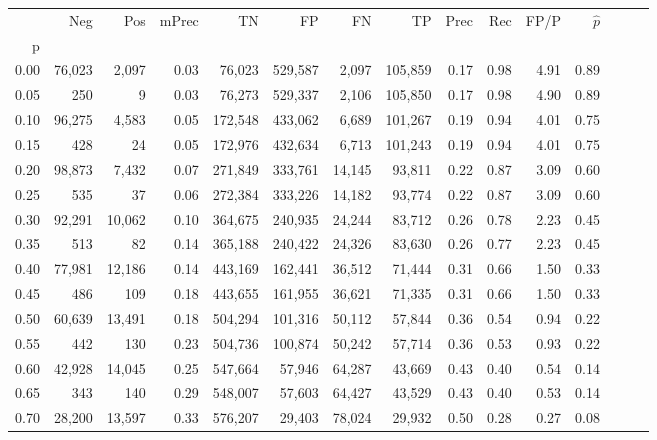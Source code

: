 \begin{tabular}{rrrrrrrrrrrrrrr}
\toprule
{} &     Neg &     Pos & mPrec &       TN &       FP &       FN &       TP &  Prec &   Rec &  FP/P & $\hat{p}$ \\
p    &         &         &       &          &          &          &          &       &       &       &           \\
\midrule
0.00 &  76,023 &   2,097 &  0.03 &   76,023 &  529,587 &    2,097 &  105,859 &  0.17 &  0.98 &  4.91 &      0.89 \\
0.05 &     250 &       9 &  0.03 &   76,273 &  529,337 &    2,106 &  105,850 &  0.17 &  0.98 &  4.90 &      0.89 \\
0.10 &  96,275 &   4,583 &  0.05 &  172,548 &  433,062 &    6,689 &  101,267 &  0.19 &  0.94 &  4.01 &      0.75 \\
0.15 &     428 &      24 &  0.05 &  172,976 &  432,634 &    6,713 &  101,243 &  0.19 &  0.94 &  4.01 &      0.75 \\
0.20 &  98,873 &   7,432 &  0.07 &  271,849 &  333,761 &   14,145 &   93,811 &  0.22 &  0.87 &  3.09 &      0.60 \\
0.25 &     535 &      37 &  0.06 &  272,384 &  333,226 &   14,182 &   93,774 &  0.22 &  0.87 &  3.09 &      0.60 \\
0.30 &  92,291 &  10,062 &  0.10 &  364,675 &  240,935 &   24,244 &   83,712 &  0.26 &  0.78 &  2.23 &      0.45 \\
0.35 &     513 &      82 &  0.14 &  365,188 &  240,422 &   24,326 &   83,630 &  0.26 &  0.77 &  2.23 &      0.45 \\
0.40 &  77,981 &  12,186 &  0.14 &  443,169 &  162,441 &   36,512 &   71,444 &  0.31 &  0.66 &  1.50 &      0.33 \\
0.45 &     486 &     109 &  0.18 &  443,655 &  161,955 &   36,621 &   71,335 &  0.31 &  0.66 &  1.50 &      0.33 \\
0.50 &  60,639 &  13,491 &  0.18 &  504,294 &  101,316 &   50,112 &   57,844 &  0.36 &  0.54 &  0.94 &      0.22 \\
0.55 &     442 &     130 &  0.23 &  504,736 &  100,874 &   50,242 &   57,714 &  0.36 &  0.53 &  0.93 &      0.22 \\
0.60 &  42,928 &  14,045 &  0.25 &  547,664 &   57,946 &   64,287 &   43,669 &  0.43 &  0.40 &  0.54 &      0.14 \\
0.65 &     343 &     140 &  0.29 &  548,007 &   57,603 &   64,427 &   43,529 &  0.43 &  0.40 &  0.53 &      0.14 \\
0.70 &  28,200 &  13,597 &  0.33 &  576,207 &   29,403 &   78,024 &   29,932 &  0.50 &  0.28 &  0.27 &      0.08 \\

\end{tabular}
